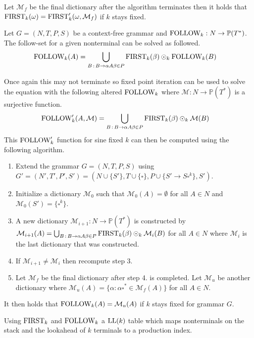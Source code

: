Let $\mathcal{M}_f$ be the final dictionary after the algorithm terminates then it holds that $\text{FIRST}_k(\omega) = \text{FIRST}'_k(\omega, \mathcal{M}_f)$ if $k$ stays fixed.
\begin{algorithm}
    \label{algorithm:follow}
    Let $G = (N, T, P, S)$ be a context-free grammar and $\text{FOLLOW}_k: N \to \mathbb{P}(T^*)$. The follow-set for a given nonterminal can be solved as followed.
    \begin{align*}
        \text{FOLLOW}_k(A) &= \bigcup_{B \, : \, B \to \alpha A \beta \in P} \text{FIRST}_k(\beta) \odot_k \text{FOLLOW}_k(B)
    \end{align*}
\end{algorithm}
\noindent Once again this may not terminate so fixed point iteration can be used to solve the equation with the following altered $\text{FOLLOW}_k$ where $\mathcal{M}: N \to \mathbb{P}(T^*)$ is a surjective function.
\begin{align*}
    \text{FOLLOW}'_k(A, \mathcal{M}) &= \bigcup_{B \,: \, B \to \alpha A \beta \in P} \text{FIRST}_k(\beta) \odot_k \mathcal{M}(B)
\end{align*}
This $\text{FOLLOW}'_k$ function for sine fixed $k$ can then be computed using the following algorithm.
\begin{enumerate}
    \item Extend the grammar $G = (N, T, P, S)$ using $G' = (N', T', P', S') = (N \cup \{S'\}, T \cup \{\square\}, P \cup \{S' \to S \square^k\}, S')$.
    \item Initialize a dictionary $\mathcal{M}_0$ such that $\mathcal{M}_0(A) = \emptyset$ for all $A \in N$ and $\mathcal{M}_0(S') = \{\square^k\}$.
    \item A new dictionary $\mathcal{M}_{i+1}: N \to \mathbb{P}(T^*)$ is constructed by $\mathcal{M}_{i+1}(A) = \bigcup_{B \,: \, B \to  \alpha A \beta \in P} \text{FIRST}_k(\beta) \odot_k \mathcal{M}_{i}(B)$ for all $A \in N$ where $\mathcal{M}_{i}$ is the last dictionary that was constructed.
    \item If $\mathcal{M}_{i+1} \neq \mathcal{M}_{i}$ then recompute step 3.
    \item Let $\mathcal{M}_f$ be the final dictionary after step 4. is completed. Let $\mathcal{M}_u$ be another dictionary where $\mathcal{M}_u(A) = \{\alpha : \alpha \square^* \in \mathcal{M}_f(A)\}$ for all $A \in N$. 
\end{enumerate}
It then holds that $\text{FOLLOW}_k(A) = \mathcal{M}_u(A)$ if $k$ stays fixed for grammar $G$.

Using $\text{FIRST}_k$ and $\text{FOLLOW}_k$ a $\text{LL}(k)$ table which maps nonterminals on the stack and the lookahead of $k$ terminals to a production index.

